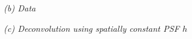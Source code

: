 \documentclass[a0paper,portrait,fontscale=0.35]{baposter}
\newcommand{\mycaption}[1]{
  {
    \smaller
    \emph{#1}
  }
}
\theoremstyle{plain}
\theoremstyle{plain}
\theoremstyle{definition}
\theoremstyle{plain}
\theoremstyle{definition}
\begin{document}
\begin{poster}
{\begin{minipage}[t]{0.49\textwidth}
\begin{minipage}[t]{0.49\textwidth}
        \vspace{-0.3em}
        \mycaption{
          (b) Data 
        }
      \end{minipage}

      \begin{minipage}[t]{0.49\textwidth}
        \centering

        \vspace{-0.3em}
        \mycaption{
          (c) Deconvolution using spatially constant PSF $h$ 
        }
      \end{minipage}
      \begin{minipage}[t]{0.49\textwidth}
        \centering


\end{minipage}
\end{minipage}}
\end{poster}
\end{document}
